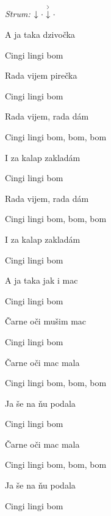 \begin{song}


\begin{headerbox}
\RaiseBoxWithAccents
{} \quad
\textit{Strum:} $\Down\Miss\AccentDown\Miss$
\end{headerbox}

\begin{vchordbox}
\end{vchordbox}

\Large

\bigskip

A ja taka dzivočka \par
{}Cingi lingi bom \par
{}Rada vijem pirečka \par
{}Cingi lingi bom \par

\bigskip

Rada vijem, rada dám \par
{}Cingi lingi bom, bom, bom \par
{}I za kalap zakladám \par
{}Cingi lingi bom \par
{}Rada vijem, rada dám \par
{}Cingi lingi bom, bom, bom \par
{}I za kalap zakladám \par
{}Cingi lingi bom \par

\bigskip

A ja taka jak i mac \par
{}Cingi lingi bom \par
{}Čarne oči mušim mac \par
{}Cingi lingi bom \par

\bigskip

Čarne oči mac mala \par
{}Cingi lingi bom, bom, bom \par
{}Ja še na ňu podala \par
{}Cingi lingi bom \par
{}Čarne oči mac mala \par
{}Cingi lingi bom, bom, bom \par
{}Ja še na ňu podala \par
{}Cingi lingi bom \par


\end{song}
